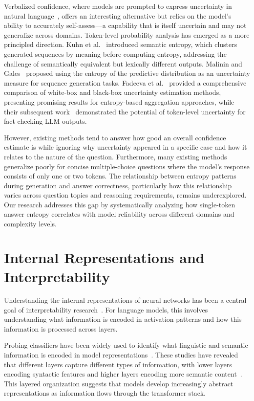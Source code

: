 Verbalized confidence, where models are prompted to express uncertainty in natural language~\cite{kadavath2022language,lin2022teaching}, offers an interesting alternative but relies on the model's ability to accurately self-assess---a capability that is itself uncertain and may not generalize across domains. Token-level probability analysis has emerged as a more principled direction. Kuhn et al.~\cite{kuhn2023semantic} introduced semantic entropy, which clusters generated sequences by meaning before computing entropy, addressing the challenge of semantically equivalent but lexically different outputs. Malinin and Gales~\cite{malinin2021uncertainty} proposed using the entropy of the predictive distribution as an uncertainty measure for sequence generation tasks. Fadeeva et al.~\cite{fadeeva2023lmpolygraph} provided a comprehensive comparison of white-box and black-box uncertainty estimation methods, presenting promising results for entropy-based aggregation approaches, while their subsequent work~\cite{fadeeva2024factchecking} demonstrated the potential of token-level uncertainty for fact-checking LLM outputs.

However, existing methods tend to answer how good an overall confidence estimate is while ignoring why uncertainty appeared in a specific case and how it relates to the nature of the question. Furthermore, many existing methods generalize poorly for concise multiple-choice questions where the model's response consists of only one or two tokens. The relationship between entropy patterns during generation and answer correctness, particularly how this relationship varies across question topics and reasoning requirements, remains underexplored. Our research addresses this gap by systematically analyzing how single-token answer entropy correlates with model reliability across different domains and complexity levels.

\section{Internal Representations and Interpretability}

Understanding the internal representations of neural networks has been a central goal of interpretability research~\cite{olah2017feature,elhage2022toy}. For language models, this involves understanding what information is encoded in activation patterns and how this information is processed across layers.

Probing classifiers have been widely used to identify what linguistic and semantic information is encoded in model representations~\cite{belinkov2017neural,conneau2018you}. These studies have revealed that different layers capture different types of information, with lower layers encoding syntactic features and higher layers encoding more semantic content~\cite{jawahar2019does}. This layered organization suggests that models develop increasingly abstract representations as information flows through the transformer stack.

